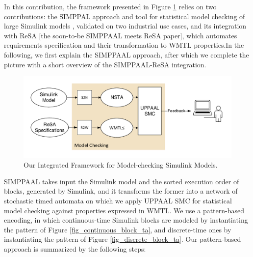 In this contribution, the framework presented in Figure \ref{fig_simulink_modelchecking} relies on two contributions: the SIMPPAL approach and tool for statistical model checking of large Simulink models \cite{Filipovikj2016SimulinkSystems}, validated on two industrial use cases, and its integration with ReSA [the soon-to-be SIMPPAAL meets ReSA paper], which automates requirements specification and their transformation to WMTL properties.In the following, we first explain the SIMPPAAL approach, after which we complete the picture with a short overview of the SIMPPAAL-ReSA integration. 
\begin{figure}[h]
  \centering
  \includegraphics[trim=0 0.75cm 0 0.75cm,clip, width=0.9\linewidth]{modelchecking.pdf}
  \caption{Our Integrated Framework for Model-checking Simulink Models.}
  \label{fig_simulink_modelchecking}
\end{figure}

SIMPPAAL takes input the Simulink model and the sorted execution order of blocks, generated by Simulink, and it transforms the former into a network of stochastic timed automata on which we apply UPPAAL SMC for statistical model checking against properties expressed in WMTL. We use a pattern-based encoding, in which continuous-time Simulink blocks are modeled by instantiating the pattern of Figure \ref{fig_continuous_block_ta}, and discrete-time ones by instantiating the pattern of Figure \ref{fig_discrete_block_ta}. Our pattern-based approach is summarized by the following steps: 


